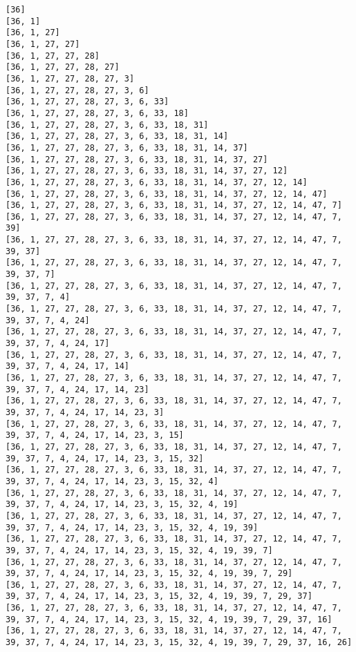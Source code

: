 \documentclass[11pt]{article}
\begin{document}
\begin{Verbatim}[commandchars=\\\{\}]
[36]
[36, 1]
[36, 1, 27]
[36, 1, 27, 27]
[36, 1, 27, 27, 28]
[36, 1, 27, 27, 28, 27]
[36, 1, 27, 27, 28, 27, 3]
[36, 1, 27, 27, 28, 27, 3, 6]
[36, 1, 27, 27, 28, 27, 3, 6, 33]
[36, 1, 27, 27, 28, 27, 3, 6, 33, 18]
[36, 1, 27, 27, 28, 27, 3, 6, 33, 18, 31]
[36, 1, 27, 27, 28, 27, 3, 6, 33, 18, 31, 14]
[36, 1, 27, 27, 28, 27, 3, 6, 33, 18, 31, 14, 37]
[36, 1, 27, 27, 28, 27, 3, 6, 33, 18, 31, 14, 37, 27]
[36, 1, 27, 27, 28, 27, 3, 6, 33, 18, 31, 14, 37, 27, 12]
[36, 1, 27, 27, 28, 27, 3, 6, 33, 18, 31, 14, 37, 27, 12, 14]
[36, 1, 27, 27, 28, 27, 3, 6, 33, 18, 31, 14, 37, 27, 12, 14, 47]
[36, 1, 27, 27, 28, 27, 3, 6, 33, 18, 31, 14, 37, 27, 12, 14, 47, 7]
[36, 1, 27, 27, 28, 27, 3, 6, 33, 18, 31, 14, 37, 27, 12, 14, 47, 7, 39]
[36, 1, 27, 27, 28, 27, 3, 6, 33, 18, 31, 14, 37, 27, 12, 14, 47, 7, 39, 37]
[36, 1, 27, 27, 28, 27, 3, 6, 33, 18, 31, 14, 37, 27, 12, 14, 47, 7, 39, 37, 7]
[36, 1, 27, 27, 28, 27, 3, 6, 33, 18, 31, 14, 37, 27, 12, 14, 47, 7, 39, 37, 7, 4]
[36, 1, 27, 27, 28, 27, 3, 6, 33, 18, 31, 14, 37, 27, 12, 14, 47, 7, 39, 37, 7, 4, 24]
[36, 1, 27, 27, 28, 27, 3, 6, 33, 18, 31, 14, 37, 27, 12, 14, 47, 7, 39, 37, 7, 4, 24, 17]
[36, 1, 27, 27, 28, 27, 3, 6, 33, 18, 31, 14, 37, 27, 12, 14, 47, 7, 39, 37, 7, 4, 24, 17, 14]
[36, 1, 27, 27, 28, 27, 3, 6, 33, 18, 31, 14, 37, 27, 12, 14, 47, 7, 39, 37, 7, 4, 24, 17, 14, 23]
[36, 1, 27, 27, 28, 27, 3, 6, 33, 18, 31, 14, 37, 27, 12, 14, 47, 7, 39, 37, 7, 4, 24, 17, 14, 23, 3]
[36, 1, 27, 27, 28, 27, 3, 6, 33, 18, 31, 14, 37, 27, 12, 14, 47, 7, 39, 37, 7, 4, 24, 17, 14, 23, 3, 15]
[36, 1, 27, 27, 28, 27, 3, 6, 33, 18, 31, 14, 37, 27, 12, 14, 47, 7, 39, 37, 7, 4, 24, 17, 14, 23, 3, 15, 32]
[36, 1, 27, 27, 28, 27, 3, 6, 33, 18, 31, 14, 37, 27, 12, 14, 47, 7, 39, 37, 7, 4, 24, 17, 14, 23, 3, 15, 32, 4]
[36, 1, 27, 27, 28, 27, 3, 6, 33, 18, 31, 14, 37, 27, 12, 14, 47, 7, 39, 37, 7, 4, 24, 17, 14, 23, 3, 15, 32, 4, 19]
[36, 1, 27, 27, 28, 27, 3, 6, 33, 18, 31, 14, 37, 27, 12, 14, 47, 7, 39, 37, 7, 4, 24, 17, 14, 23, 3, 15, 32, 4, 19, 39]
[36, 1, 27, 27, 28, 27, 3, 6, 33, 18, 31, 14, 37, 27, 12, 14, 47, 7, 39, 37, 7, 4, 24, 17, 14, 23, 3, 15, 32, 4, 19, 39, 7]
[36, 1, 27, 27, 28, 27, 3, 6, 33, 18, 31, 14, 37, 27, 12, 14, 47, 7, 39, 37, 7, 4, 24, 17, 14, 23, 3, 15, 32, 4, 19, 39, 7, 29]
[36, 1, 27, 27, 28, 27, 3, 6, 33, 18, 31, 14, 37, 27, 12, 14, 47, 7, 39, 37, 7, 4, 24, 17, 14, 23, 3, 15, 32, 4, 19, 39, 7, 29, 37]
[36, 1, 27, 27, 28, 27, 3, 6, 33, 18, 31, 14, 37, 27, 12, 14, 47, 7, 39, 37, 7, 4, 24, 17, 14, 23, 3, 15, 32, 4, 19, 39, 7, 29, 37, 16]
[36, 1, 27, 27, 28, 27, 3, 6, 33, 18, 31, 14, 37, 27, 12, 14, 47, 7, 39, 37, 7, 4, 24, 17, 14, 23, 3, 15, 32, 4, 19, 39, 7, 29, 37, 16, 26]

\end{Verbatim}
\end{document}
